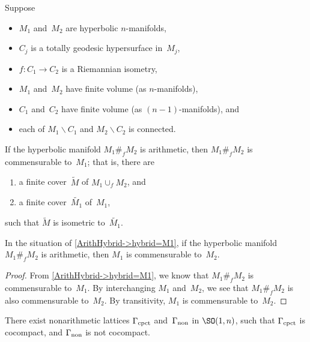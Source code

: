 \begin{thm} \label{ArithHybrid->hybrid=M1}
 Suppose
 \noprelistbreak
 \begin{itemize}
 \item $M_1$ and~$M_2$ are hyperbolic $n$-manifolds,
 \item $C_j$ is a totally geodesic hypersurface in~$M_j$,
 \item $f \colon C_1 \to C_2$ is a Riemannian isometry,
 \item $M_1$ and~$M_2$ have finite volume \textup(as
$n$-manifolds\textup),
 \item $C_1$ and~$C_2$ have finite volume \textup(as
$(n-1)$-manifolds\textup),
 and
 \item each of $M_1 \smallsetminus C_1$ and $M_2
\smallsetminus C_2$ is connected.
 \end{itemize}
 If the hyperbolic manifold $M_1 \#_f M_2$ is
arithmetic, then $M_1 \#_f M_2$ is commensurable
to~$M_1$; that is, there are
 \begin{enumerate}
 \item a finite cover~$\widetilde{M}$ of $M_1 \cup_f M_2$,
and
 \item a finite cover~$\widetilde{M_1}$ of~$M_1$,
 \end{enumerate}
 such that $\widetilde{M}$ is isometric
to~$\widetilde{M_1}$.
 \end{thm}

\begin{cor} \label{ArithHybrid->M1=M2}
 In the situation of \cref{ArithHybrid->hybrid=M1},
 if the hyperbolic manifold $M_1 \#_f M_2$ is
arithmetic, then $M_1$ is commensurable to~$M_2$.
 \end{cor}

\begin{proof}
 From \cref{ArithHybrid->hybrid=M1}, we know that $M_1
\#_f M_2$ is commensurable to~$M_1$. By interchanging $M_1$
and~$M_2$, we see that $M_1 \#_f M_2$ is also commensurable
to~$M_2$. By transitivity, $M_1$ is commensurable to~$M_2$.
 \end{proof}

\begin{cor} \label{NonarithInSO1n}
 There exist nonarithmetic lattices\/
$\Gamma_\text{\upshape cpct}$ and\/~$\Gamma_\text{\upshape
non}$ in\/ $\SO(1,n)$, such that\/ $\Gamma_\text{\upshape
cpct}$ is cocompact, and\/ $\Gamma_\text{\upshape non}$ is
not cocompact.
 \end{cor}

